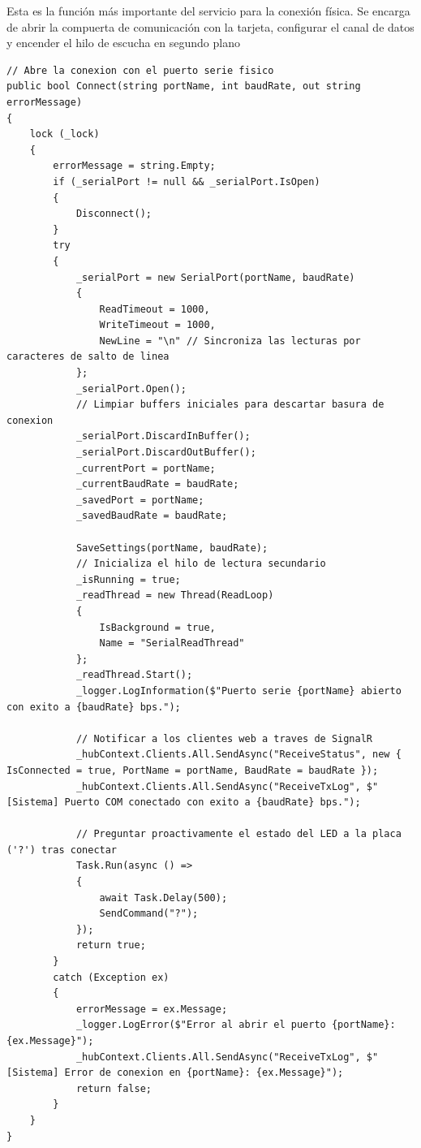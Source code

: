 \documentclass[
10pt, %
a4paper, %
oneside, %
headinclude,footinclude, %
BCOR5mm, %
]{scrartcl}
\begin{document}
Esta es la función más importante del servicio para la conexión física. Se encarga de abrir la compuerta de comunicación con la tarjeta, configurar el canal de datos y encender el hilo de escucha en segundo plano
\begin{lstlisting}[style=VSCodeDark]
// Abre la conexion con el puerto serie fisico
public bool Connect(string portName, int baudRate, out string errorMessage)
{
	lock (_lock)
	{
		errorMessage = string.Empty;
		if (_serialPort != null && _serialPort.IsOpen)
		{
			Disconnect();
		}
		try
		{
			_serialPort = new SerialPort(portName, baudRate)
			{
				ReadTimeout = 1000,
				WriteTimeout = 1000,
				NewLine = "\n" // Sincroniza las lecturas por caracteres de salto de linea
			};
			_serialPort.Open();
			// Limpiar buffers iniciales para descartar basura de conexion
			_serialPort.DiscardInBuffer();
			_serialPort.DiscardOutBuffer();
			_currentPort = portName;
			_currentBaudRate = baudRate;
			_savedPort = portName;
			_savedBaudRate = baudRate;
			
			SaveSettings(portName, baudRate);
			// Inicializa el hilo de lectura secundario
			_isRunning = true;
			_readThread = new Thread(ReadLoop)
			{
				IsBackground = true,
				Name = "SerialReadThread"
			};
			_readThread.Start();
			_logger.LogInformation($"Puerto serie {portName} abierto con exito a {baudRate} bps.");
			
			// Notificar a los clientes web a traves de SignalR
			_hubContext.Clients.All.SendAsync("ReceiveStatus", new { IsConnected = true, PortName = portName, BaudRate = baudRate });
			_hubContext.Clients.All.SendAsync("ReceiveTxLog", $"[Sistema] Puerto COM conectado con exito a {baudRate} bps.");
			
			// Preguntar proactivamente el estado del LED a la placa ('?') tras conectar
			Task.Run(async () =>
			{
				await Task.Delay(500);
				SendCommand("?");
			});
			return true;
		}
		catch (Exception ex)
		{
			errorMessage = ex.Message;
			_logger.LogError($"Error al abrir el puerto {portName}: {ex.Message}");
			_hubContext.Clients.All.SendAsync("ReceiveTxLog", $"[Sistema] Error de conexion en {portName}: {ex.Message}");
			return false;
		}
	}
}
\end{lstlisting}
\end{document}
